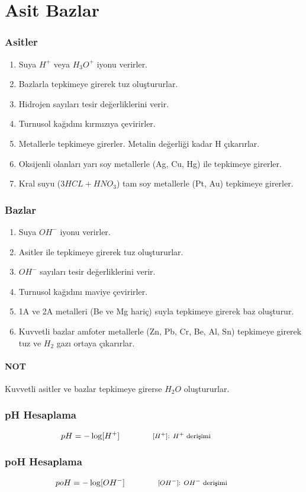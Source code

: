 \section{Asit Bazlar}

\subsubsection*{Asitler}
\begin{enumerate}
\item Suya $H^+$ veya $H_3O^+$ iyonu verirler.
\item Bazlarla tepkimeye girerek tuz oluştururlar.
\item Hidrojen sayıları tesir değerliklerini verir.
\item Turnusol kağıdını kırmızıya çevirirler.
\item Metallerle tepkimeye girerler. Metalin değerliği kadar H çıkarırlar.
\item Oksijenli olanları yarı soy metallerle (Ag, Cu, Hg) ile tepkimeye girerler.
\item Kral suyu ($3HCL + HNO_3$) tam soy metallerle (Pt, Au) tepkimeye girerler.
\end{enumerate}

\subsubsection*{Bazlar}
\begin{enumerate}
\item Suya $OH^-$ iyonu verirler.
\item Asitler ile tepkimeye girerek tuz oluştururlar.
\item $OH^-$ sayıları tesir değerliklerini verir.
\item Turnusol kağıdını maviye çevirirler.
\item 1A ve 2A metalleri (Be ve Mg hariç) suyla tepkimeye girerek baz oluşturur.
\item Kuvvetli bazlar amfoter metallerle (Zn, Pb, Cr, Be, Al, Sn) tepkimeye girerek tuz ve $H_2$ gazı ortaya çıkarırlar.
\end{enumerate}

\paragraph*{NOT}
Kuvvetli asitler ve bazlar tepkimeye girerse $H_2O$ oluştururlar.

\subsubsection*{pH Hesaplama}
\begin{equation}
    pH = -\log [H^+] \qquad \qquad \parbox{4cm}{\footnotesize$\begin{aligned}
        [H^+]\text{: $H^+$ derişimi }
\end{aligned}$}
\end{equation}

\subsubsection*{poH Hesaplama}
\begin{equation}
    poH = -\log [OH^-] \qquad \qquad \parbox{4cm}{\footnotesize$\begin{aligned}
        [OH^-]\text{: $OH^-$ derişimi }
\end{aligned}$}
\end{equation}
